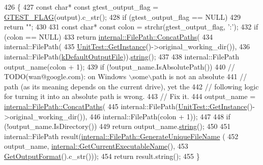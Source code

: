 \begin{DoxyCode}
426                                                        \{
427   \textcolor{keyword}{const} \textcolor{keywordtype}{char}* \textcolor{keyword}{const} gtest\_output\_flag = \hyperlink{gtest-port_8h_a828f4e34a1c4b510da50ec1563e3562a}{GTEST\_FLAG}(output).c\_str();
428   \textcolor{keywordflow}{if} (gtest\_output\_flag == NULL)
429     \textcolor{keywordflow}{return} \textcolor{stringliteral}{""};
430 
431   \textcolor{keyword}{const} \textcolor{keywordtype}{char}* \textcolor{keyword}{const} colon = strchr(gtest\_output\_flag, \textcolor{charliteral}{':'});
432   \textcolor{keywordflow}{if} (colon == NULL)
433     \textcolor{keywordflow}{return} \hyperlink{classtesting_1_1internal_1_1FilePath_ac9d57987f60ac43f0c57b89e333e531e}{internal::FilePath::ConcatPaths}(
434         internal::FilePath(
435             \hyperlink{classtesting_1_1UnitTest_a24192400b70b3b946746954e9574fb8e}{UnitTest::GetInstance}()->original\_working\_dir()),
436         internal::FilePath(\hyperlink{namespacetesting_aa5a002b5bb3784c830b1c99aa2688f27}{kDefaultOutputFile})).\hyperlink{classtesting_1_1internal_1_1FilePath_ab1d58734f2e179264eb6353fea57361d}{string}();
437 
438   internal::FilePath output\_name(colon + 1);
439   \textcolor{keywordflow}{if} (!output\_name.IsAbsolutePath())
440     \textcolor{comment}{// TODO(wan@google.com): on Windows \(\backslash\)some\(\backslash\)path is not an absolute}
441     \textcolor{comment}{// path (as its meaning depends on the current drive), yet the}
442     \textcolor{comment}{// following logic for turning it into an absolute path is wrong.}
443     \textcolor{comment}{// Fix it.}
444     output\_name = \hyperlink{classtesting_1_1internal_1_1FilePath_ac9d57987f60ac43f0c57b89e333e531e}{internal::FilePath::ConcatPaths}(
445         internal::FilePath(\hyperlink{classtesting_1_1UnitTest_a24192400b70b3b946746954e9574fb8e}{UnitTest::GetInstance}()->original\_working\_dir()),
446         internal::FilePath(colon + 1));
447 
448   \textcolor{keywordflow}{if} (!output\_name.IsDirectory())
449     \textcolor{keywordflow}{return} output\_name.\hyperlink{classtesting_1_1internal_1_1FilePath_ab1d58734f2e179264eb6353fea57361d}{string}();
450 
451   internal::FilePath result(\hyperlink{classtesting_1_1internal_1_1FilePath_a2280a77adb394cf80bb5f73fc292e8c8}{internal::FilePath::GenerateUniqueFileName}
      (
452       output\_name, \hyperlink{namespacetesting_1_1internal_a7a2bbf069f75bc99873976ad6fc356ad}{internal::GetCurrentExecutableName}(),
453       \hyperlink{classtesting_1_1internal_1_1UnitTestOptions_ae7413a21296d885c6924650b51ac4f6d}{GetOutputFormat}().c\_str()));
454   \textcolor{keywordflow}{return} result.string();
455 \}
\end{DoxyCode}
